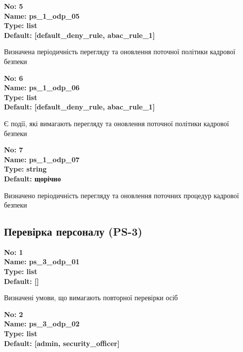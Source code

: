 \documentclass{article}
\begin{document}
{\footnotesize\bfseries
No: 5\\
Name: ps\_\allowbreak{}1\_\allowbreak{}odp\_\allowbreak{}05\\
Type: list\\
Default: [\textquotedbl{}default\_\allowbreak{}deny\_\allowbreak{}rule\textquotedbl{}, \textquotedbl{}abac\_\allowbreak{}rule\_\allowbreak{}1\textquotedbl{}]
}

{\footnotesize Визначена періодичність перегляду та оновлення поточної політики кадрової безпеки}


{\footnotesize\bfseries
No: 6\\
Name: ps\_\allowbreak{}1\_\allowbreak{}odp\_\allowbreak{}06\\
Type: list\\
Default: [\textquotedbl{}default\_\allowbreak{}deny\_\allowbreak{}rule\textquotedbl{}, \textquotedbl{}abac\_\allowbreak{}rule\_\allowbreak{}1\textquotedbl{}]
}

{\footnotesize Є події, які вимагають перегляду та оновлення поточної політики кадрової безпеки}


{\footnotesize\bfseries
No: 7\\
Name: ps\_\allowbreak{}1\_\allowbreak{}odp\_\allowbreak{}07\\
Type: string\\
Default: \textquotedbl{}щорічно\textquotedbl{}
}

{\footnotesize Визначено періодичність перегляду та оновлення поточних процедур кадрової безпеки}




\subsection{Перевірка персоналу (PS-3)}


\vspace{10pt}
{\footnotesize\bfseries
No: 1\\
Name: ps\_\allowbreak{}3\_\allowbreak{}odp\_\allowbreak{}01\\
Type: list\\
Default: []
}

{\footnotesize Визначені умови, що вимагають повторної перевірки осіб}


{\footnotesize\bfseries
No: 2\\
Name: ps\_\allowbreak{}3\_\allowbreak{}odp\_\allowbreak{}02\\
Type: list\\
Default: [\textquotedbl{}admin\textquotedbl{}, \textquotedbl{}security\_\allowbreak{}officer\textquotedbl{}]
}
\end{document}

